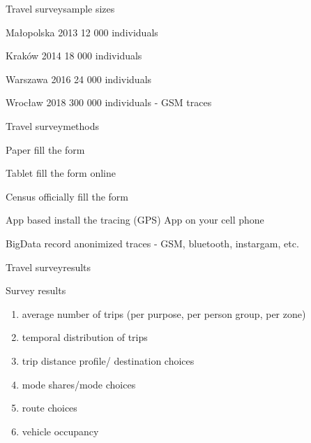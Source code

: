 \documentclass[8pt]{beamer}
\begin{document}
\begin{frame}{Travel survey}{sample sizes}
	\begin{block}{Małopolska 2013}
		12 000 individuals	
	\end{block}
	\begin{block}{Kraków 2014}
		18 000 individuals	
	\end{block}
	
	\begin{block}{Warszawa 2016}
		24 000 individuals	
	\end{block}
	
	\begin{block}{Wrocław 2018}
		300 000 individuals	- GSM traces
	\end{block}
	
\end{frame}

\begin{frame}{Travel survey}{methods}
	\begin{block}{Paper}
		fill the form
	\end{block}
	
	\begin{block}{Tablet}
		fill the form online
	\end{block}
	
	\begin{block}{Census}
		officially fill the form
	\end{block}
	
	\begin{block}{App based}
		install the tracing (GPS) App on your cell phone
	\end{block}
	
	\begin{block}{BigData}
		record anonimized traces - GSM, bluetooth, instargam, etc.
	\end{block}
	
\end{frame}

\begin{frame}{Travel survey}{results}
	\begin{block}{Survey results}
		\begin{enumerate}
		\item average number of trips (per purpose, per person group, per zone)
		\item temporal distribution of trips
		\item trip distance profile/ destination choices
		\item mode shares/mode choices
		\item route choices
		\item vehicle occupancy
		\end{enumerate}	
	\end{block}	
\end{frame}
\end{document}
